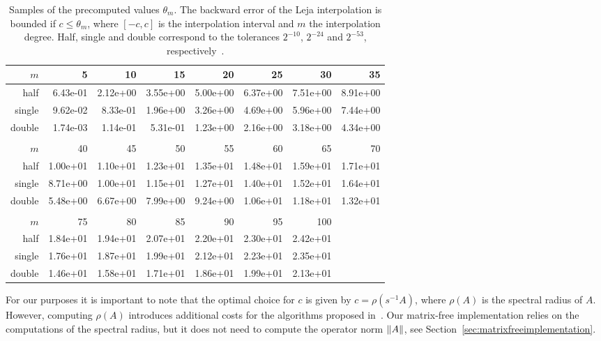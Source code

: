 \documentclass{scrartcl}
\begin{document}
	\begin{table}[tbp]
		\begin{tabular}{r|rrrrrrr}
			$m$ &        5 &       10 &       15 &       20 &       25 &       30 &       35 \\\hline
			half & 6.43e-01 & 2.12e+00 & 3.55e+00 & 5.00e+00 & 6.37e+00 & 7.51e+00 & 8.91e+00 \\
			single & 9.62e-02 & 8.33e-01 & 1.96e+00 & 3.26e+00 & 4.69e+00 & 5.96e+00 & 7.44e+00 \\
			double & 1.74e-03 & 1.14e-01 & 5.31e-01 & 1.23e+00 & 2.16e+00 & 3.18e+00 & 4.34e+00 \\
			\\
			$m$ &       40 &       45 &       50 &       55 &       60 &       65 &       70 \\\hline
			half & 1.00e+01 & 1.10e+01 & 1.23e+01 & 1.35e+01 & 1.48e+01 & 1.59e+01 & 1.71e+01 \\
			single & 8.71e+00 & 1.00e+01 & 1.15e+01 & 1.27e+01 & 1.40e+01 & 1.52e+01 & 1.64e+01 \\
			double & 5.48e+00 & 6.67e+00 & 7.99e+00 & 9.24e+00 & 1.06e+01 & 1.18e+01 & 1.32e+01 \\
			\\
			$m$ &       75 &       80 &       85 &       90 &       95 &      100 \\ \hline
			half & 1.84e+01 & 1.94e+01 & 2.07e+01 & 2.20e+01 & 2.30e+01 & 2.42e+01 \\
			single & 1.76e+01 & 1.87e+01 & 1.99e+01 & 2.12e+01 & 2.23e+01 & 2.35e+01 \\
			double & 1.46e+01 & 1.58e+01 & 1.71e+01 & 1.86e+01 & 1.99e+01 & 2.13e+01
		\end{tabular}
		\caption{Samples of the precomputed values $\theta_m$. The backward error of the Leja interpolation is bounded if $c\le\theta_m$, where $[-c,c]$ is the interpolation interval and $m$ the interpolation degree. Half, single and double correspond to the tolerances $2^{-10}$, $2^{-24}$ and $2^{-53}$, respectively~\cite[Table 1]{lejarev}.}
		\label{table:thetam}
	\end{table}For our purposes it is important to note that the optimal choice for $c$ is given by $c=\rho(s^{-1}A)$, where $\rho(A)$ is the spectral radius of $A$. However, computing $\rho(A)$ introduces additional costs for the algorithms proposed in~\cite{lejarev}. Our matrix-free implementation relies on the computations of the spectral radius, but it does not need to compute the operator norm $\lVert A\rVert$, see Section~\ref{sec:matrixfreeimplementation}.
	
\end{document}
